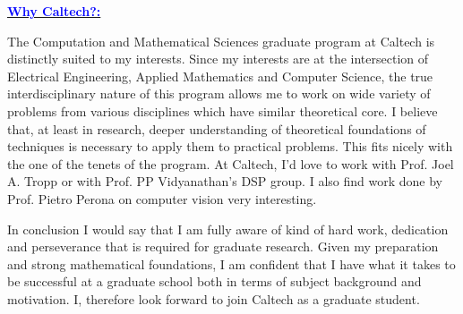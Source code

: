 \documentclass[11pt]{article}
\newcommand{\statement}[1]{\par\medskip
  \underline{\textcolor{blue}{\textbf{#1:}}}\space
}
\begin{document}
\statement{Why Caltech?}
The Computation and Mathematical Sciences graduate program at Caltech is distinctly suited to my interests. 
Since my interests are at the intersection of Electrical Engineering, Applied Mathematics and Computer Science, the true interdisciplinary nature of this program allows me to work on wide variety of problems from various disciplines which have similar theoretical core. 
I believe that, at least in research, deeper understanding of theoretical foundations of techniques is necessary to apply them to practical problems. 
This fits nicely with the one of the tenets of the program. 
At Caltech, I'd love to work with Prof. Joel A. Tropp or with Prof. PP Vidyanathan's DSP group. I also find work done by Prof. Pietro Perona on computer vision very interesting.

\medskip
In conclusion I would say that I am fully aware of kind of hard work, dedication and perseverance that is required for graduate research. Given my preparation and strong mathematical foundations,  I am confident that I have what it takes to be successful at a graduate school both in terms of subject background and motivation. I, therefore look forward to join Caltech as a graduate student.
\end{document}
